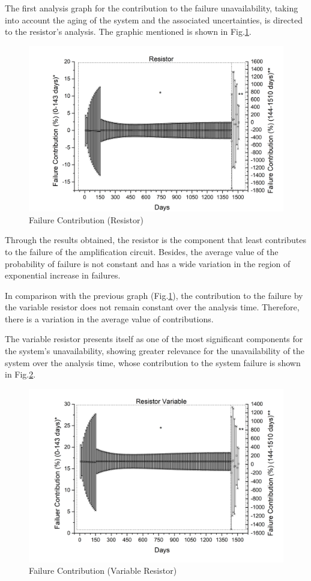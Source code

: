 \documentclass{ws-m3as}
\begin{document}
The first analysis graph for the contribution to the failure unavailability, taking into account the aging of the system and the associated uncertainties, is directed to the resistor's analysis. The graphic mentioned is shown in Fig.\ref{fig:12}. 

\begin{figure} [H]
	\centering
	\includegraphics[width=0.8\linewidth]{Figures/RFFull}
	\caption{Failure Contribution (Resistor)}
	\label{fig:rffull}
	\label{fig:12}	
\end{figure}
 
Through the results obtained, the resistor is the component that least contributes to the failure of the amplification circuit. Besides, the average value of the probability of failure is not constant and has a wide variation in the region of exponential increase in failures.
 
In comparison with the previous graph (Fig.\ref{fig:12}), the contribution to the failure by the variable resistor does not remain constant over the analysis time. Therefore, there is a variation in the average value of contributions.

The variable resistor presents itself as one of the most significant components for the system's unavailability, showing greater relevance for the unavailability of the system over the analysis time, whose contribution to the system failure is shown in Fig.\ref{fig:13}.

\begin{figure} [H]
	\centering
	\includegraphics[width=0.8\linewidth]{Figures/RVFull}
	\caption{Failure Contribution (Variable Resistor)}
	\label{fig:rvfull}
	\label{fig:13}
\end{figure}
\end{document}
